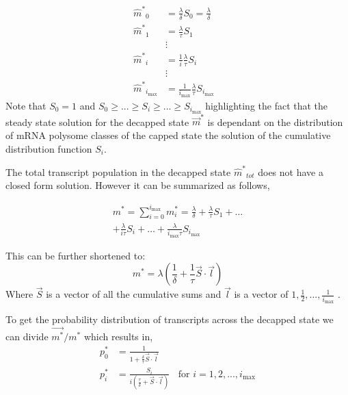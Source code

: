 \documentclass[a4,center,fleqn,nocrop]{NAR}
\newcommand{\imax}{\ensuremath{{i_{\max}}}\xspace}
\newcommand{\mhat}{\ensuremath{\hat{m}}\xspace}
\newcommand{\mhatstar}{\ensuremath{\mhat^{*}}\xspace}
\newcommand{\mvec}{\ensuremath{\vec{m}}\xspace}
\newcommand{\mvecstar}{\ensuremath{\mvec^*}\xspace}
\newcommand{\msumstar}{\ensuremath{m^*}\xspace}
\begin{document}
\begin{align} \label{eq:decapped_solution} 
\mhatstar_0  &= \frac{\lambda}{\delta}S_{0}=\frac{\lambda}{\delta} \nonumber \\
\mhatstar_1  &= \frac{\lambda}{\tau}S_{1} \nonumber \\
& \vdots & \nonumber \\
\mhatstar_i  &= \frac{1}{i}\frac{\lambda}{\tau}S_{i}  \nonumber \\
& \vdots & \nonumber \\
\mhatstar_{\imax}  &= \frac{1}{\imax}\frac{\lambda}{\tau}S_{\imax}  \nonumber
\end{align}
 Note that $S_{0}=1$ and $ S_{0} \ge ... \ge S_{i} \ge ... \ge S_{\imax}$ highlighting the fact that the steady state solution for the decapped state \mvecstar is dependant on the distribution of mRNA polysome classes of the capped state the solution of the cumulative distribution function $S_i$. %

The total transcript population in the decapped state $\mhatstar_{tot}$ does not have a closed form solution. However it can be summarized as follows,


\begin{align*}
	\msumstar = \sum_{i=0}^{\imax} m_{i}^{*} = \frac{\lambda}{\delta} + \frac{\lambda}{\tau}S_{1}+ \hdots \\
 + \frac{\lambda}{i \tau}S_{i} + \hdots  + \frac{\lambda}{\imax \tau}S_{\imax} 
\end{align*}

This can be further shortened to:
\begin{equation} \label{eq: marked_total_pop}
	\msumstar = \lambda(\frac{1}{\delta} + \frac{1}{\tau}\vec{S} \cdot \vec{l}	) 
\end{equation}
Where $\vec{S}$ is a vector of all the cumulative sums and $\vec{l}$ is a vector of $1,\frac{1}{2},...,\frac{1}{\imax}$ . 


To get the probability distribution of transcripts across the decapped state we can divide $\vec{m^{*}}/\msumstar$ which results in,
\begin{align}\label{eq:decapped_distribution}
	p_{0}^{*} &= \frac{1}{1 + \frac{\delta}{\tau}\vec{S} \cdot \vec{l}}	\\
  	p_{i}^{*} &= \frac{S_{i}}{i(\frac{\tau}{\delta} + \vec{S} \cdot \vec{l})}	\:\:\:\: \text{for } i=1, 2, ..., \imax
\end{align}
\end{document}

